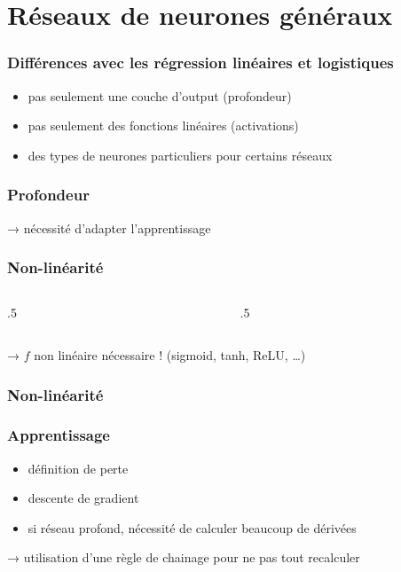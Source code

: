 \documentclass{formation}
\begin{document}
\section{Réseaux de neurones généraux}

\begin{frame}
  \frametitle{Différences avec les régression linéaires et
    logistiques}

  \begin{itemize}
  \item pas seulement une couche d'output (profondeur)
  \item pas seulement des fonctions linéaires (activations)
  \item des types de neurones particuliers pour certains réseaux
  \end{itemize}
\end{frame}

\begin{frame}
  \frametitle{Profondeur}


  → nécessité d'adapter l'apprentissage
\end{frame}

\begin{frame}
  \frametitle{Non-linéarité}

  \begin{columns}
    \begin{column}{.5\tw}
      
    \end{column}
    \begin{column}{.5\tw}
    \end{column}
  \end{columns}

  → $f$ non linéaire nécessaire ! (sigmoid, tanh, ReLU, …)
\end{frame}

\begin{frame}
  \frametitle{Non-linéarité}

\end{frame}

\begin{frame}
  \frametitle{Apprentissage}

  \begin{itemize}
  \item définition de perte
  \item descente de gradient
  \item si réseau profond, nécessité de calculer beaucoup de dérivées
  \end{itemize}

  → utilisation d'une règle de chainage pour ne pas tout recalculer
\end{frame}
\end{document}
